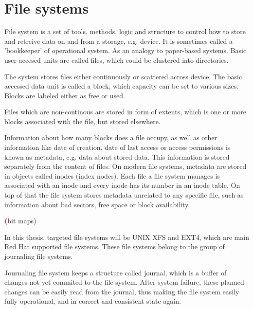 \documentclass[
  color, %
  table, %
  lof,   %
  lot,   %
]{fithesis3}
\newcommand{\todo}[1]{\textcolor{red}{\textbf{#1}}}
\begin{document}
\section{File systems}
File system is a set of tools, methods, logic and structure to control how to store and retreive data on and from a storage, e.g. device. It is sometimes called a 'bookkeeper' of operational system. As an  analogy to paper-based systems. Basic user-accesed units are called files, which could be clustered into directories.

The system stores files either continuously or scattered across device. The basic accessed data unit is called a block, which capacity can be set to various sizes. Blocks are labeled either as free or used.

Files which are non-continous are stored in form of extents, which is one or more blocks associated with the file, but stored elsewhere.  

Information about how many blocks does a file occupy, as well as other information like date of creation, date of last access or access permissions is known as metadata, e.g. data about stored data. This information is stored separately from the content of files. On modern file systems, metadata are stored in objects called inodes (index nodes). Each file a file system manages is associated with an inode and every inode has its number in an inode table. On top of that the file system stores metadata unrelated to any specific file, such as information about bad sectors, free space or block availability.


\todo(bit maps)

In this thesis, targeted file systems will be UNIX XFS and EXT4, which are main Red Hat supported file systems. These file systems belong to the group of journaling file systems.

Journaling file system keeps a structure called journal, which is a buffer of changes not yet commited to the file system. After system failure, these planned changes can be easily read from the journal, thus making the file system easily fully operational, and in correct and consistent state again.
\end{document}
